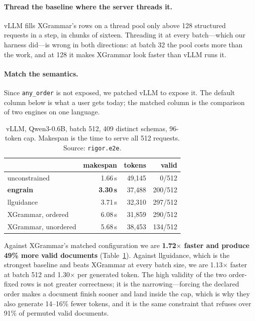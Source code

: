 \documentclass{article}
\begin{document}
\paragraph{Thread the baseline where the server threads it.} vLLM fills
XGrammar's rows on a thread pool only above 128 structured requests in a step,
in chunks of sixteen. Threading it at every batch---which our harness did---is
wrong in both directions: at batch 32 the pool costs more than the work, and at
128 it makes XGrammar look faster than vLLM runs it.

\paragraph{Match the semantics.} Since \texttt{any\_order} is not exposed, we
patched vLLM to expose it. The default column below is what a user gets today;
the matched column is the comparison of two engines on one language.

\begin{table}[t]
\caption{vLLM, Qwen3-0.6B, batch 512, 409 distinct schemas, 96-token cap.
Makespan is the time to serve all 512 requests. Source: \texttt{rigor.e2e}.}
\label{tab:e2e}
\vskip 0.1in
\begin{center}
\begin{small}
\begin{tabular}{lrrr}
\toprule
 & makespan & tokens & valid \\
\midrule
unconstrained & 1.66\,s & 49{,}145 & 0/512 \\
\textbf{engrain} & \textbf{3.30\,s} & 37{,}488 & 200/512 \\
llguidance & 3.71\,s & 32{,}310 & 297/512 \\
XGrammar, ordered & 6.08\,s & 31{,}859 & 290/512 \\
XGrammar, unordered & 5.68\,s & 38{,}453 & 134/512 \\
\bottomrule
\end{tabular}
\end{small}
\end{center}
\vskip -0.1in
\end{table}

Against XGrammar's matched configuration we are \textbf{1.72$\times$ faster and
produce 49\% more valid documents} (Table~\ref{tab:e2e}). Against llguidance,
which is the strongest baseline and beats XGrammar at every batch size, we are
1.13$\times$ faster at batch 512 and 1.30$\times$ per generated token. The high
validity of the two order-fixed rows is not greater correctness; it is the
narrowing---forcing the declared order makes a document finish sooner and land
inside the cap, which is why they also generate 14--16\% fewer tokens, and it
is the same constraint that refuses over 91\% of permuted valid documents.
\end{document}
